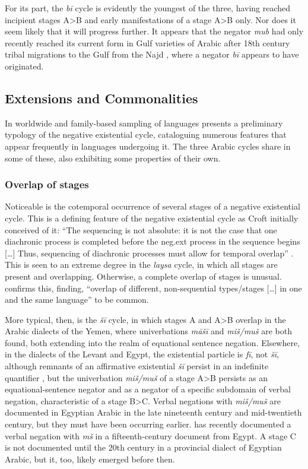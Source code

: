 \documentclass[output=paper]{langsci/langscibook}
\begin{document}
For its part, the \textit{bī} cycle is evidently the youngest of the three, having reached incipient stages A>B and early manifestations of a stage A>B only. Nor does it seem likely that it will progress further. It appears that the negator \textit{mub} had only recently reached its current form in Gulf varieties of Arabic after 18th century tribal migrations to the Gulf from the Najd \citep[28-30]{holes2006a}, where a negator \textit{bī} appears to have originated.

\subsection{Extensions and Commonalities} \label{s:WiAR-5.1}

In worldwide and family-based sampling of languages \citet{Veselinova2016} presents a preliminary typology of the negative existential cycle, cataloguing numerous features that appear frequently in languages undergoing it. The three Arabic cycles share in some of these, also exhibiting some properties of their own. 

\subsubsection{Overlap of stages} \label{s:WiAR-5.1.1}

Noticeable is the cotemporal occurrence of several stages of a negative existential cycle. This is a defining feature of the negative existential cycle as Croft initially conceived of it: “The sequencing is not absolute: it is not the case that one diachronic process is completed before the neg.ext process in the sequence begins [\dots] Thus, sequencing of diachronic processes must allow for temporal overlap” \citep[22]{Croft1991}. This is seen to an extreme degree in the \textit{laysa} cycle, in which all stages are present and overlapping. Otherwise, a complete overlap of stages is unusual. \citet[151–154 and passim]{Veselinova2016} confirms this, finding, “overlap of different, non-sequential types/stages [\dots] in one and the same language” \citeyearpar[154, emphasis added]{Veselinova2016} to be common. 

More typical, then, is the \textit{šī} cycle, in which stages A and A>B overlap in the Arabic dialects of the Yemen, where univerbations \textit{māšī} and \textit{miš/muš} are both found, both extending into the realm of equational sentence negation. Elsewhere, in the dialects of the Levant and Egypt, the existential particle is \textit{fī}, not \textit{šī}, although remnants of an affirmative existential \textit{šī} persist in an indefinite quantifier \citep{wilmsen2017a}, but the univerbation \textit{miš/muš} of a stage A>B persists as an equational-sentence negator and as a negator of a specific subdomain of verbal negation, characteristic of a stage B>C. Verbal negations with \textit{miš/muš} are documented in Egyptian Arabic in the late nineteenth century and mid-twentieth century, but they must have been occurring earlier. \citet[158]{wagner2010a} has recently documented a verbal negation with \textit{mš} in a fifteenth-century document from Egypt. A stage C is not documented until the 20th century in a provincial dialect of Egyptian Arabic, but it, too, likely emerged before then.
\end{document}
